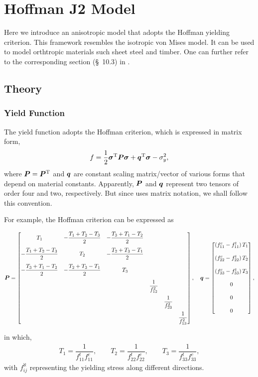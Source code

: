 \section{Hoffman J2 Model}\label{sec:hoffman}
Here we introduce an anisotropic model that adopts the Hoffman yielding criterion. This framework resembles the isotropic von Mises model. It can be used to model orthtropic materials such sheet steel and timber.
One can further refer to the corresponding section (\S~10.3) in \cite{SouzaNeto2008}.
\subsection{Theory}
\subsubsection{Yield Function}
The yield function adopts the Hoffman criterion, which is expressed in matrix form,
\begin{gather}
f=\dfrac{1}{2}\bm{\sigma}^{\mathrm{T}}\bm{P}\bm{\sigma}+\bm{q}^{\mathrm{T}}\bm{\sigma}-\sigma_y^2,
\end{gather}
where $\bm{P}=\bm{P}^{\mathrm{T}}$ and $\bm{q}$ are constant scaling matrix/vector of various forms \cite{Oller2003} that depend on material constants.
Apparently, $\bm{P}$ and $\bm{q}$ represent two tensors of order four and two, respectively.
But since \cite{Oller2003} uses matrix notation, we shall follow this convention.

For example, the Hoffman criterion can be expressed as
\begin{tiny}
\begin{gather}\label{eq:hoffman_criterion}
\bm{P}=\begin{bmatrix}
T_1&-\dfrac{T_1+T_2-T_3}{2}&-\dfrac{T_3+T_1-T_2}{2}&&&\\[4mm]
-\dfrac{T_1+T_2-T_3}{2}&T_2&-\dfrac{T_2+T_3-T_1}{2}&&&\\[4mm]
-\dfrac{T_3+T_1-T_2}{2}&-\dfrac{T_2+T_3-T_1}{2}&T_3&&&\\[4mm]
&&&\dfrac{1}{f_{12}^2}&&\\[4mm]
&&&&\dfrac{1}{f_{23}^2}&\\[4mm]
&&&&&\dfrac{1}{f_{13}^2}
\end{bmatrix},\quad
\bm{q}=\begin{bmatrix}
\left(f_{11}^c-f_{11}^t\right)T_1\\[4mm]
\left(f_{22}^c-f_{22}^t\right)T_2\\[4mm]
\left(f_{33}^c-f_{33}^t\right)T_3\\[4mm]
0\\[4mm]
0\\[4mm]
0
\end{bmatrix},
\end{gather}
\end{tiny}
in which,
\begin{gather}
T_1=\dfrac{1}{f_{11}^tf_{11}^c},\qquad
T_2=\dfrac{1}{f_{22}^tf_{22}^c},\qquad
T_3=\dfrac{1}{f_{33}^tf_{33}^c},
\end{gather}
with $f_{ij}^\aleph$ representing the yielding stress along different directions.
